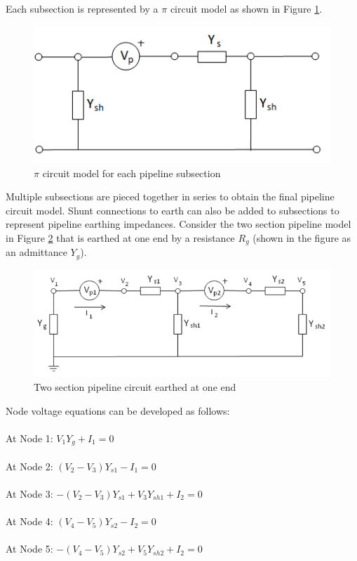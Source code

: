 \documentclass{article}
\begin{document}
Each subsection is represented by a $\pi$ circuit model as shown in Figure \ref{fig:pi_section}.

\begin{figure}
\begin{center}
\caption{$\pi$ circuit model for each pipeline subsection}
\label{fig:pi_section}
\includegraphics[scale=0.6]{./Figures/pi_section.png}
\end{center}
\end{figure}

Multiple subsections are pieced together in series to obtain the final pipeline circuit model. Shunt connections to earth can also be added to subsections to represent pipeline earthing impedances. Consider the two section pipeline model in Figure \ref{fig:two_section} that is earthed at one end by a resistance $R_g$ (shown in the figure as an admittance $Y_g$).

\begin{figure}
\begin{center}
\caption{Two section pipeline circuit earthed at one end}
\label{fig:two_section}
\includegraphics[width=\linewidth]{./Figures/two_section_pipe.png}
\end{center}
\end{figure}

Node voltage equations can be developed as follows:
\\ \\
\hphantom{whe}At Node 1: $V_1 Y_g + I_1 = 0$ \\ \\
\hphantom{whe}At Node 2: $(V_2 - V_3)Y_{s1} - I_1 = 0$ \\ \\
\hphantom{whe}At Node 3: $-(V_2 - V_3)Y_{s1} + V_3 Y_{sh1} + I_2 = 0$ \\ \\
\hphantom{whe}At Node 4: $(V_4 - V_5)Y_{s2} - I_2 = 0$ \\ \\
\hphantom{whe}At Node 5: $-(V_4 - V_5)Y_{s2} + V_5 Y_{sh2} + I_2 = 0$ \\
\end{document}
